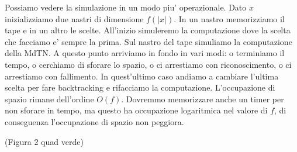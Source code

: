 Possiamo vedere la simulazione in un modo piu' operazionale. Dato $x$ inizializziamo due nastri di
dimensione $f(|x|)$. In un nastro memorizziamo il tape e in un altro le scelte. All'inizio
simuleremo la computazione dove la scelta che facciamo e' sempre la prima. Sul nastro del tape
simuliamo la computazione della MdTN. A questo punto arriviamo in fondo in vari modi: o terminiamo
il tempo, o cerchiamo di sforare lo spazio, o ci arrestiamo con riconoscimento, o ci arrestiamo con
fallimento. In quest'ultimo caso andiamo a cambiare l'ultima scelta per fare backtracking e
rifacciamo la computazione. L'occupazione di spazio rimane dell'ordine $O(f)$. Dovremmo memorizzare
anche un timer per non sforare in tempo, ma questo ha occupazione logaritmica nel valore di $f$, di
conseguenza l'occupazione di spazio non peggiora.

(Figura 2 quad verde)
